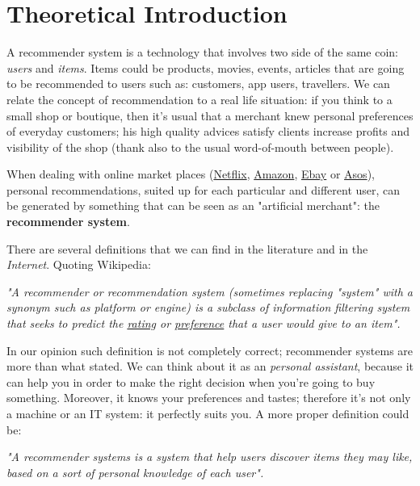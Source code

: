 \section{Theoretical Introduction}

A recommender system is a technology that involves two side of the same coin: \textit{users} and \textit{items}. Items could be products, movies, events, articles that are going to be recommended to users such as: customers, app users, travellers. We can relate the concept of recommendation to a real life situation: if you think to a small shop or boutique, then it's usual that a merchant knew personal preferences of everyday customers; his high quality advices satisfy clients increase profits and visibility of the shop (thank also to the usual word-of-mouth between people).

When dealing with online market places (\href{https://www.netflix.com/}{Netflix}, \href{https://www.amazon.com/}{Amazon}, \href{https://www.ebay.com/}{Ebay} or \href{http://www.asos.com/}{Asos}), personal recommendations, suited up for each particular and different user, can be generated by something that can be seen as an "artificial merchant": the \textbf{recommender system}.

There are several definitions that we can find in the literature and in the \textit{Internet}. Quoting Wikipedia: 

\begin{displayquote}
\textit{"A recommender or recommendation system (sometimes replacing "system" with a synonym such as platform or engine) is a subclass of information filtering system that seeks to predict the \underline{rating} or \underline{preference} that a user would give to an item".}
\end{displayquote}

In our opinion such definition is not completely correct; recommender systems are more than what stated. We can think about it as an \textit{personal assistant}, because it can help you in order to make the right decision when you're going to buy something. Moreover, it knows your preferences and tastes; therefore it's not only a machine or an IT system: it perfectly suits you. A more proper definition could be: 

\begin{displayquote}
\textit{"A recommender systems is a system that help users discover items they may like, based on a sort of personal knowledge of each user".}
\end{displayquote}

